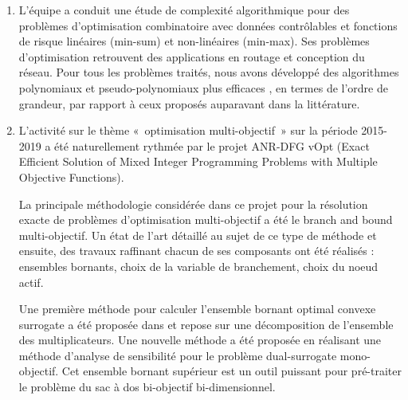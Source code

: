 \begin{enumerate}
    \item L’équipe a conduit une étude de complexité algorithmique pour des problèmes d'optimisation combinatoire avec données contrôlables et fonctions de risque linéaires (min-sum) et non-linéaires (min-max). Ses problèmes d’optimisation retrouvent des applications en routage et conception du réseau. Pour tous les problèmes traités, nous avons développé des algorithmes polynomiaux et pseudo-polynomiaux plus efficaces \cite{gurevsky:hal-01262639,gurevsky:hal-01272518,gurevsky:hal-01341259,gurevsky:hal-01518346}, en termes de l'ordre de grandeur, par rapport à ceux proposés auparavant dans la littérature. 
    
    \item L’activité sur le thème « optimisation multi-objectif » sur la période 2015-2019 a été naturellement rythmée par le projet ANR-DFG vOpt (Exact Efficient Solution of Mixed Integer Programming Problems with Multiple Objective Functions).


La principale méthodologie considérée dans ce projet pour la résolution exacte de problèmes d’optimisation multi-objectif a été le branch and bound multi-objectif. Un état de l’art détaillé au sujet de ce type de méthode \cite{przybylski:hal-01717951} et ensuite, des travaux raffinant chacun de ses composants ont été réalisés : ensembles bornants, choix de la variable de branchement, choix du noeud actif. 


Une première méthode pour calculer l’ensemble bornant optimal convexe surrogate a été proposée dans \cite{cerqueus:hal-01158355} et repose sur une décomposition de l’ensemble des multiplicateurs. Une nouvelle méthode \cite{przybylski:hal-02480174} a été proposée en réalisant une méthode d’analyse de sensibilité pour le problème dual-surrogate mono-objectif. Cet ensemble bornant supérieur est un outil puissant pour pré-traiter le problème du sac à dos bi-objectif bi-dimensionnel.


\end{enumerate}
